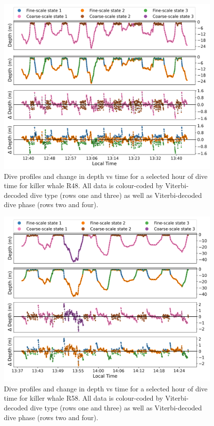\documentclass[12pt]{article}
\begin{document}
\begin{figure}[H]
    \centering
    \includegraphics[width=6.5in]{../plt/decoded_dives_kw_R48_K_3_3_nWhales_8.png}
    \caption{Dive profiles and change in depth vs time for a selected hour of dive time for killer whale R48. All data is colour-coded by Viterbi-decoded dive type (rows one and three) as well as Viterbi-decoded dive phase (rows two and four).}
    \label{fig:R48}
\end{figure}

\begin{figure}[H]
    \centering
    \includegraphics[width=6.5in]{../plt/decoded_dives_kw_R58_K_3_3_nWhales_8.png}
    \caption{Dive profiles and change in depth vs time for a selected hour of dive time for killer whale R58. All data is colour-coded by Viterbi-decoded dive type (rows one and three) as well as Viterbi-decoded dive phase (rows two and four).}
    \label{fig:R58}
\end{figure}
\end{document}
